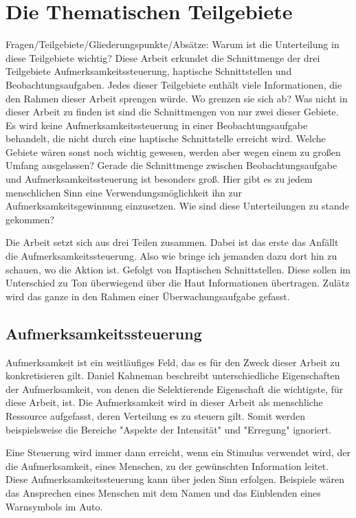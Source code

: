 \documentclass{llncs}					%
\begin{document}
\section{Die Thematischen Teilgebiete}
Fragen/Teilgebiete/Gliederungspunkte/Absätze:
Warum ist die Unterteilung in diese Teilgebiete wichtig?
Diese Arbeit erkundet die Schnittmenge der drei Teilgebiete Aufmerksamkeitssteuerung, haptische Schnittstellen und Beobachtungsaufgaben. Jedes dieser Teilgebiete enthält viele Informationen, die den Rahmen dieser Arbeit sprengen würde.
Wo grenzen sie sich ab?
Was nicht in dieser Arbeit zu finden ist sind die Schnittmengen von nur zwei dieser Gebiete. Es wird keine Aufmerksamkeitssteuerung in einer Beobachtungsaufgabe behandelt, die nicht durch eine haptische Schnittstelle erreicht wird.
Welche Gebiete wären sonst noch wichtig gewesen, werden aber wegen einem zu großen Umfang ausgelassen?
Gerade die Schnittmenge zwischen Beobachtungsaufgabe und Aufmerksamkeitssteuerung ist besonders groß. Hier gibt es zu jedem menschlichen Sinn eine Verwendungsmöglichkeit ihn zur Aufmerksamkeitsgewinnung einzusetzen.
Wie sind diese Unterteilungen zu stande gekommen?

Die Arbeit setzt sich aus drei Teilen zusammen. Dabei ist das erste das Anfällt die Aufmerksamkeitssteuerung. Also wie bringe ich jemanden dazu dort hin zu schauen, wo die Aktion ist. Gefolgt von Haptischen Schnittstellen. Diese sollen im Unterschied zu Ton überwiegend über die Haut Informationen übertragen. Zulätz wird das ganze in den Rahmen einer Überwachungsaufgabe gefasst.

\subsection{Aufmerksamkeitssteuerung}
Aufmerksamkeit ist ein weitläufiges Feld, das es für den Zweck dieser Arbeit zu konkretisieren gilt. Daniel Kahneman \cite{kahneman1973attention} beschreibt unterschiedliche Eigenschaften der Aufmerksamkeit, von denen die Selektierende Eigenschaft die wichtigste, für diese Arbeit, ist.
Die Aufmerksamkeit wird in dieser Arbeit als menschliche Ressource aufgefasst, deren Verteilung es zu steuern gilt. Somit werden beispielsweise die Bereiche "Aspekte der Intensität"\cite{kahneman1973attention} und "Erregung"\cite{kahneman1973attention} ignoriert.

Eine Steuerung wird immer dann erreicht, wenn ein Stimulus verwendet wird, der die Aufmerksamkeit, eines Menschen, zu der gewünschten Information leitet. Diese Aufmerksamkeitssteuerung kann über jeden Sinn erfolgen. Beispiele wären das Ansprechen eines Menschen mit dem Namen und das Einblenden eines Warnsymbols im Auto.
\end{document}
